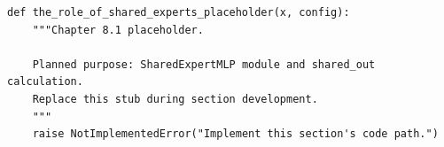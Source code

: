 \begin{lstlisting}[style=bookpython,caption={Planned code placeholder for the role of shared experts.},label={lst:ch08-the-role-of-shared-experts}]
def the_role_of_shared_experts_placeholder(x, config):
    """Chapter 8.1 placeholder.

    Planned purpose: SharedExpertMLP module and shared_out calculation.
    Replace this stub during section development.
    """
    raise NotImplementedError("Implement this section's code path.")
\end{lstlisting}
